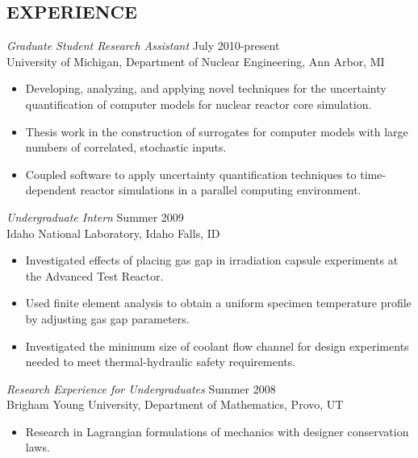 \documentclass[margin, 10pt]{res} %
\begin{document}
\begin{resume}
 
\section{EXPERIENCE}

{\sl Graduate Student Research Assistant} \hfill July 2010-present \\
University of Michigan, Department of Nuclear Engineering, Ann Arbor, MI

\begin{itemize} \itemsep -2pt %
\item Developing, analyzing, and applying novel techniques for the uncertainty quantification of computer models for nuclear reactor core simulation.
\item Thesis work in the construction of surrogates for computer models with large numbers of correlated, stochastic inputs.  
\item Coupled software to apply uncertainty quantification techniques to time-dependent reactor simulations in a parallel computing environment.  
\end{itemize}

{\sl Undergraduate Intern} \hfill Summer 2009 \\
Idaho National Laboratory, Idaho Falls, ID 

\begin{itemize} \itemsep -2pt %
\item Investigated effects of placing gas gap in irradiation capsule experiments at the Advanced Test Reactor. 
\item Used finite element analysis to obtain a uniform specimen temperature profile by adjusting gas gap parameters.
\item Investigated the minimum size of coolant flow channel for design experiments needed to meet thermal-hydraulic safety requirements.
\end{itemize}
 
{\sl Research Experience for Undergraduates} \hfill Summer 2008 \\
Brigham Young University, Department of Mathematics, Provo, UT 
\begin{itemize} 
\item Research in Lagrangian formulations of mechanics with designer conservation laws. 
\end{itemize} 


\end{resume}
\end{document}
